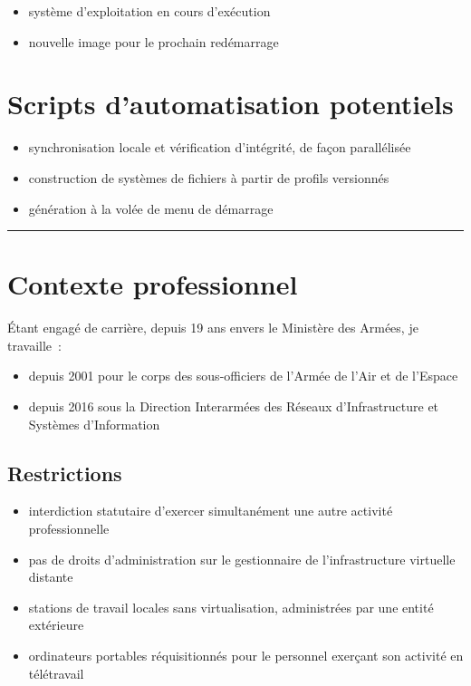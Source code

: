 \documentclass[10pt]{article}
\newcommand{\hr}{\rule{\textwidth}{1pt}}
\newenvironment{itmz}{\begin{itemize}
\setlength{\itemsep}{0em}
}{\end{itemize}}
\begin{document}
\begin{itmz}
\item{système d’exploitation en cours d’exécution}
\item{nouvelle image pour le prochain redémarrage}
\end{itmz}

\section{Scripts d’automatisation potentiels}

\begin{itmz}
\item{synchronisation locale et vérification d’intégrité, de façon parallélisée}
\item{construction de systèmes de fichiers à partir de profils versionnés}
\item{génération à la volée de menu de démarrage}
\end{itmz}

\hr

\appendix

\section{Contexte professionnel}

Étant engagé de carrière, depuis 19 ans envers le Ministère des Armées, je travaille :
\begin{itmz}
\item{depuis 2001 pour le corps des sous-officiers de l’Armée de l’Air et de l’Espace}
\item{depuis 2016 sous la Direction Interarmées des Réseaux d’Infrastructure et Systèmes d’Information}
\end{itmz}

\subsection{Restrictions}

\begin{itmz}
\item{interdiction statutaire d’exercer simultanément une autre activité professionnelle}
\item{pas de droits d’administration sur le gestionnaire de l’infrastructure virtuelle distante}
\item{stations de travail locales sans virtualisation, administrées par une entité extérieure}
\item{ordinateurs portables réquisitionnés pour le personnel exerçant son activité en télétravail}
\end{itmz}
\end{document}
